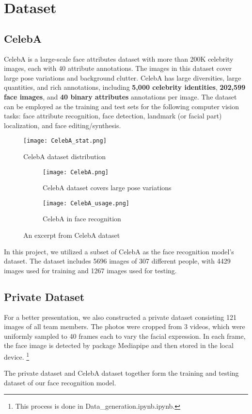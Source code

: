 \section{Dataset}

\subsection{CelebA} \label{sec:CelebA}

CelebA is a large-scale face attributes dataset with more than 200K celebrity images, each with 40 attribute annotations. The images in this dataset cover large pose variations and background clutter. CelebA has large diversities, large quantities, and rich annotations, including \textbf{5,000 celebrity identities}, \textbf{202,599 face images}, and \textbf{40 binary attributes} annotations per image. The dataset can be employed as the training and test sets for the following computer vision tasks: face attribute recognition, face detection, landmark (or facial part) localization, and face editing/synthesis.

\begin{figure}[h]
\centering
\texttt{[image: CelebA\_stat.png]}
\caption{CelebA dataset distribution}
\label{fig:CelebA_stat}
\end{figure}

\begin{figure}[htbp]
    \centering
    \begin{subfigure}{0.4\textwidth}
        \centering
        \texttt{[image: CelebA.png]}
        \caption{CelebA dataset covers large pose variations}
    \end{subfigure}
    \qquad
    \begin{subfigure}{0.4\textwidth}
        \centering
        \texttt{[image: CelebA\_usage.png]}
        \caption{CelebA in face recognition}
    \end{subfigure}
    \caption{An excerpt from CelebA dataset}
    \label{fig:CelebA}
\end{figure}

In this project, we utilized a subset of CelebA as the face recognition model's dataset. The dataset includes 5696 images of 307 different people, with 4429 images used for training and 1267 images used for testing.

\subsection{Private Dataset}

For a better presentation, we also constructed a private dataset consisting 121 images of all team members. The photos were cropped from 3 videos, which were uniformly sampled to 40 frames each to vary the facial expression. In each frame, the face image is detected by package Mediapipe and then stored in the local device. \footnote{This process is done in Data\_generation.ipynb.ipynb.}

The private dataset and CelebA dataset together form the training and testing dataset of our face recognition model.
